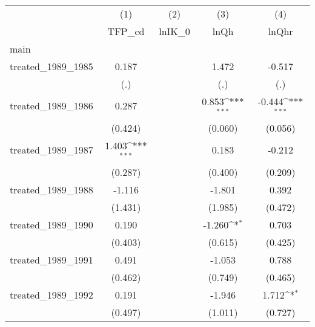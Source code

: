 {
\def\sym#1{\ifmmode^{#1}\else\(^{#1}\)\fi}
\begin{tabular}{l*{4}{c}}
\hline\hline
            &\multicolumn{1}{c}{(1)}&\multicolumn{1}{c}{(2)}&\multicolumn{1}{c}{(3)}&\multicolumn{1}{c}{(4)}\\
            &\multicolumn{1}{c}{TFP\_cd}&\multicolumn{1}{c}{lnIK\_0}&\multicolumn{1}{c}{lnQh}&\multicolumn{1}{c}{lnQhr}\\
\hline
main        &                     &                     &                     &                     \\
treated\_1989\_1985&       0.187         &                     &       1.472         &      -0.517         \\
            &         (.)         &                     &         (.)         &         (.)         \\
[1em]
treated\_1989\_1986&       0.287         &                     &       0.853\sym{***}&      -0.444\sym{***}\\
            &     (0.424)         &                     &     (0.060)         &     (0.056)         \\
[1em]
treated\_1989\_1987&       1.403\sym{***}&                     &       0.183         &      -0.212         \\
            &     (0.287)         &                     &     (0.400)         &     (0.209)         \\
[1em]
treated\_1989\_1988&      -1.116         &                     &      -1.801         &       0.392         \\
            &     (1.431)         &                     &     (1.985)         &     (0.472)         \\
[1em]
treated\_1989\_1990&       0.190         &                     &      -1.260\sym{*}  &       0.703         \\
            &     (0.403)         &                     &     (0.615)         &     (0.425)         \\
[1em]
treated\_1989\_1991&       0.491         &                     &      -1.053         &       0.788         \\
            &     (0.462)         &                     &     (0.749)         &     (0.465)         \\
[1em]
treated\_1989\_1992&       0.191         &                     &      -1.946         &       1.712\sym{*}  \\
            &     (0.497)         &                     &     (1.011)         &     (0.727)         \\

\end{tabular}}
